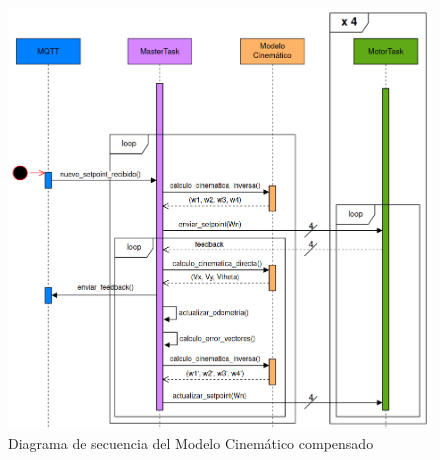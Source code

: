 \begin{figure}[htb]
    \centering
    \includegraphics[width=1\linewidth]{images/diag_secuencia_modelo_cinematico_compensado.png}
    \caption{Diagrama de secuencia del Modelo Cinemático compensado}
    \label{fig:diagsecuenciamodcinemcompens}
\end{figure}


